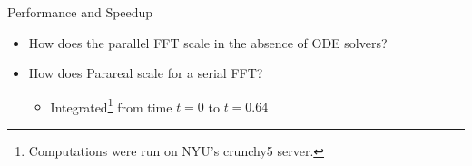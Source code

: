 \documentclass{beamer}
\begin{document}
\begin{frame}{Performance and Speedup} %

\begin{itemize}
    \item How does the parallel FFT scale in the absence of ODE solvers?
    \item How does Parareal scale for a serial FFT?
    \begin{itemize}
        \item Integrated\footnote{Computations were run on NYU's crunchy5 server.} 
        from time $t=0$ to $t=0.64$
    \end{itemize}
\end{itemize}
\pause



\end{frame}
\end{document}
